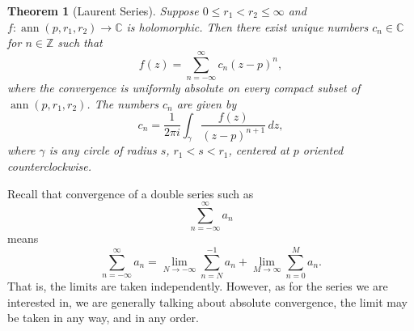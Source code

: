 \documentclass[12pt,openany]{book}
\newcommand{\ann}{\operatorname{ann}}
\newcommand{\C}{{\mathbb{C}}}
\newcommand{\Z}{{\mathbb{Z}}}
\newcommand{\myindex}[1]{#1\index{#1}}
\theoremstyle{plain}
\newtheorem{thm}{Theorem}[section]
\theoremstyle{remark}
\theoremstyle{definition}
\theoremstyle{exercise}
\theoremstyle{example}
\begin{document}
\begin{thm}[\myindex{Laurent Series}]
Suppose $0 \leq r_1 < r_2 \leq \infty$ and
$f \colon \ann(p,r_1,r_2) \to \C$ is holomorphic.
Then there exist unique numbers $c_n \in \C$ for $n \in \Z$ such that
\begin{equation*}
f(z) = \sum_{n=-\infty}^{\infty} c_n {(z-p)}^n ,
\end{equation*}
where the convergence is uniformly absolute on every compact subset of
$\ann(p,r_1,r_2)$.  The numbers $c_n$ are given by
\begin{equation*}
c_n = 
\frac{1}{2\pi i}
\int_{\gamma}
\frac{f(z)}{{(z-p)}^{n+1}}
\,
dz  ,
\end{equation*}
where $\gamma$ is any circle of radius $s$, $r_1 < s < r_1$, centered at
$p$ oriented counterclockwise.
\end{thm}

Recall that convergence of a double series such as
\begin{equation*}
\sum_{n=-\infty}^{\infty} a_n
\end{equation*}
means
\begin{equation*}
\sum_{n=-\infty}^{\infty} a_n
=
\lim_{N\to -\infty}
\sum_{n=N}^{-1} a_n
+
\lim_{M\to \infty}
\sum_{n=0}^{M} a_n .
\end{equation*}
That is, the limits are taken independently.  However, as for the series we
are interested in, we are generally talking
about absolute convergence, the limit may be taken in any way, and in any order.
\end{document}
